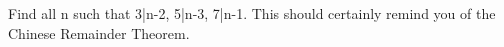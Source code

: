 
Find all n such that  3|n-2, 5|n-3, 7|n-1. This should certainly remind you of 
the Chinese Remainder Theorem. 
